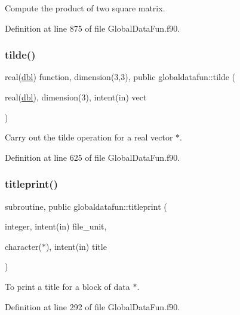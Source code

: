 Compute the product of two square matrix. 



Definition at line 875 of file Global\+Data\+Fun.\+f90.

\mbox{\label{namespaceglobaldatafun_aabcfb273a99323881aa160da1f44a561}} 
\subsubsection{\texorpdfstring{tilde()}{tilde()}}
{\footnotesize\ttfamily real(\hyperlink{namespaceglobaldatafun_a5008801201dd34f2af8eae07756befb4}{dbl}) function, dimension(3,3), public globaldatafun\+::tilde (\begin{DoxyParamCaption}\item[{real(\hyperlink{namespaceglobaldatafun_a5008801201dd34f2af8eae07756befb4}{dbl}), dimension(3), intent(in)}]{vect }\end{DoxyParamCaption})}



Carry out the tilde operation for a real vector $\ast$. 



Definition at line 625 of file Global\+Data\+Fun.\+f90.

\mbox{\label{namespaceglobaldatafun_a74b07978d9a6c644031fbb37b131f609}} 
\subsubsection{\texorpdfstring{titleprint()}{titleprint()}}
{\footnotesize\ttfamily subroutine, public globaldatafun\+::titleprint (\begin{DoxyParamCaption}\item[{integer, intent(in)}]{file\+\_\+unit,  }\item[{character($\ast$), intent(in)}]{title }\end{DoxyParamCaption})}



To print a title for a block of data $\ast$. 



Definition at line 292 of file Global\+Data\+Fun.\+f90.

